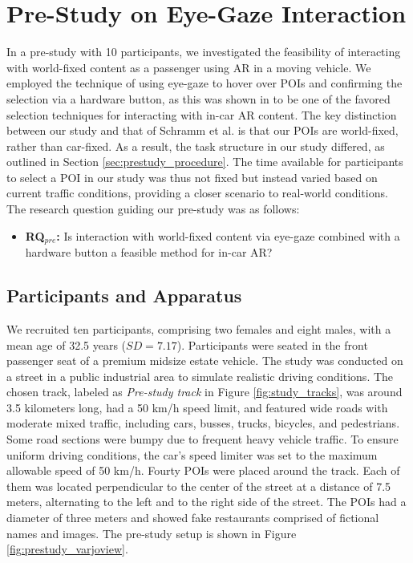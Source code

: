 \section{Pre-Study on Eye-Gaze Interaction}
\label{sec:pre-study}
In a pre-study with 10 participants, we investigated the feasibility of interacting with world-fixed content as a passenger using AR in a moving vehicle. We employed the technique of using eye-gaze to hover over POIs and confirming the selection via a hardware button, as this was shown in \cite{Schramm2023Assessing} to be one of the favored selection techniques for interacting with in-car AR content. The key distinction between our study and that of Schramm et al. \cite{Schramm2023Assessing} is that our POIs are world-fixed, rather than car-fixed. As a result, the task structure in our study differed, as outlined in Section \ref{sec:prestudy_procedure}. The time available for participants to select a POI in our study was thus not fixed but instead varied based on current traffic conditions, providing a closer scenario to real-world conditions. The research question guiding our pre-study was as follows:

\begin{itemize}
    \item \textbf{RQ$_{pre}$:} Is interaction with world-fixed content via eye-gaze combined with a hardware button a feasible method for in-car AR?
\end{itemize}


\subsection{Participants and Apparatus}
\label{sec:pre-study_apparatus}
We recruited ten participants, comprising two females and eight males, with a mean age of 32.5 years ($SD = 7.17$). Participants were seated in the front passenger seat of a premium midsize estate vehicle. The study was conducted on a street in a public industrial area to simulate realistic driving conditions. The chosen track, labeled as \textit{Pre-study track} in Figure \ref{fig:study_tracks}, was around 3.5 kilometers long, had a 50 km/h speed limit, and featured wide roads with moderate mixed traffic, including cars, busses, trucks, bicycles, and pedestrians. Some road sections were bumpy due to frequent heavy vehicle traffic. To ensure uniform driving conditions, the car's speed limiter was set to the maximum allowable speed of 50 km/h. Fourty POIs were placed around the track. Each of them was located perpendicular to the center of the street at a distance of 7.5 meters, alternating to the left and to the right side of the street. The POIs had a diameter of three meters and showed fake restaurants comprised of fictional names and images. The pre-study setup is shown in Figure \ref{fig:prestudy_varjoview}.

